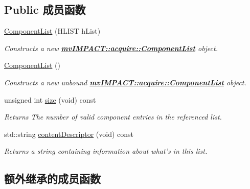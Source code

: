 \subsection*{Public 成员函数}
\begin{DoxyCompactItemize}
\item 
\hyperlink{classmv_i_m_p_a_c_t_1_1acquire_1_1_component_list_a72205cdd281a5e62a43f53af93a37643}{Component\+List} (H\+L\+I\+S\+T h\+List)
\begin{DoxyCompactList}\small\item\em Constructs a new {\bfseries \hyperlink{classmv_i_m_p_a_c_t_1_1acquire_1_1_component_list}{mv\+I\+M\+P\+A\+C\+T\+::acquire\+::\+Component\+List}} object. \end{DoxyCompactList}\item 
\hypertarget{classmv_i_m_p_a_c_t_1_1acquire_1_1_component_list_af5ffe44a2d45f74fd68c76c812d984ed}{\hyperlink{classmv_i_m_p_a_c_t_1_1acquire_1_1_component_list_af5ffe44a2d45f74fd68c76c812d984ed}{Component\+List} ()}\label{classmv_i_m_p_a_c_t_1_1acquire_1_1_component_list_af5ffe44a2d45f74fd68c76c812d984ed}

\begin{DoxyCompactList}\small\item\em Constructs a new unbound {\bfseries \hyperlink{classmv_i_m_p_a_c_t_1_1acquire_1_1_component_list}{mv\+I\+M\+P\+A\+C\+T\+::acquire\+::\+Component\+List}} object. \end{DoxyCompactList}\item 
unsigned int \hyperlink{classmv_i_m_p_a_c_t_1_1acquire_1_1_component_list_a4921fd9f3bd993a63ae69b9700a27e47}{size} (void) const 
\begin{DoxyCompactList}\small\item\em Returns The number of valid component entries in the referenced list. \end{DoxyCompactList}\item 
std\+::string \hyperlink{classmv_i_m_p_a_c_t_1_1acquire_1_1_component_list_ab182c3a56d3c9fc88df0ff90411bdf24}{content\+Descriptor} (void) const 
\begin{DoxyCompactList}\small\item\em Returns a string containing information about what's in this list. \end{DoxyCompactList}\end{DoxyCompactItemize}
\subsection*{额外继承的成员函数}


